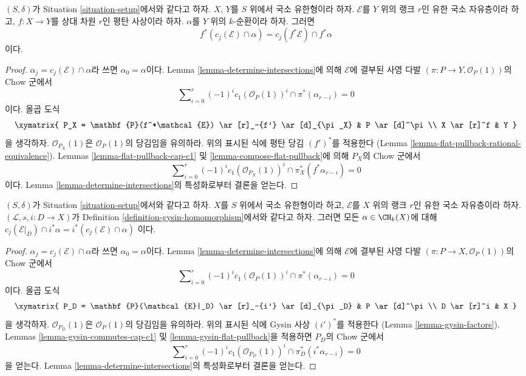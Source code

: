 \begin{lemma}
\label{lemma-flat-pullback-cap-cj}
$(S, \delta)$가 Situation \ref{situation-setup}에서와 같다고 하자.
$X$, $Y$를 $S$ 위에서 국소 유한형이라 하자. $\mathcal{E}$를 $Y$ 위의
랭크 $r$인 유한 국소 자유층이라 하고,
$f : X \to Y$를 상대 차원 $r$인 평탄 사상이라 하자. $\alpha$를 $Y$
위의 $k$-순환이라 하자. 그러면
$$
f^*(c_j(\mathcal{E}) \cap \alpha) = c_j(f^*\mathcal{E}) \cap f^*\alpha
$$
이다.
\end{lemma}

\begin{proof}
$\alpha_j = c_j(\mathcal{E}) \cap \alpha$라 쓰면
$\alpha_0 = \alpha$이다. Lemma \ref{lemma-determine-intersections}에
의해 $\mathcal{E}$에 결부된 사영 다발
$(\pi : P \to Y, \mathcal{O}_P(1))$의 Chow 군에서
$$
\sum\nolimits_{i = 0}^r
(-1)^i c_1(\mathcal{O}_P(1))^i \cap
\pi^*(\alpha_{r - i}) = 0
$$
이다. 올곱 도식
$$
\xymatrix{
P_X = \mathbf{P}(f^*\mathcal{E}) \ar[r]_-{f'} \ar[d]_{\pi_X} &
P \ar[d]^\pi \\
X \ar[r]^f & Y
}
$$
을 생각하자. $\mathcal{O}_{P_X}(1)$은 $\mathcal{O}_P(1)$의 당김임을
유의하라. 위의 표시된 식에 평탄 당김 $(f')^*$를 적용한다
(Lemma \ref{lemma-flat-pullback-rational-equivalence}). Lemmas
\ref{lemma-flat-pullback-cap-c1} 및
\ref{lemma-compose-flat-pullback}에 의해 $P_X$의 Chow 군에서
$$
\sum\nolimits_{i = 0}^r
(-1)^i c_1(\mathcal{O}_{P_X}(1))^i \cap
\pi_X^*(f^*\alpha_{r - i}) = 0
$$
이다. Lemma \ref{lemma-determine-intersections}의 특성화로부터 결론을
얻는다.
\end{proof}

\begin{lemma}
\label{lemma-cap-chern-class-commutes-with-gysin}
$(S, \delta)$가 Situation \ref{situation-setup}에서와 같다고 하자.
$X$를 $S$ 위에서 국소 유한형이라 하고, $\mathcal{E}$를 $X$ 위의
랭크 $r$인 유한 국소 자유층이라 하자.
$(\mathcal{L}, s, i : D \to X)$가 Definition
\ref{definition-gysin-homomorphism}에서와 같다고 하자. 그러면 모든
$\alpha \in \CH_k(X)$에 대해
$c_j(\mathcal{E}|_D) \cap i^*\alpha = i^*(c_j(\mathcal{E}) \cap \alpha)$
이다.
\end{lemma}

\begin{proof}
$\alpha_j = c_j(\mathcal{E}) \cap \alpha$라 쓰면
$\alpha_0 = \alpha$이다. Lemma \ref{lemma-determine-intersections}에
의해 $\mathcal{E}$에 결부된 사영 다발
$(\pi : P \to X, \mathcal{O}_P(1))$의 Chow 군에서
$$
\sum\nolimits_{i = 0}^r
(-1)^i c_1(\mathcal{O}_P(1))^i \cap
\pi^*(\alpha_{r - i}) = 0
$$
이다. 올곱 도식
$$
\xymatrix{
P_D = \mathbf{P}(\mathcal{E}|_D) \ar[r]_-{i'} \ar[d]_{\pi_D} &
P \ar[d]^\pi \\
D \ar[r]^i & X
}
$$
을 생각하자. $\mathcal{O}_{P_D}(1)$은 $\mathcal{O}_P(1)$의 당김임을
유의하라. 위의 표시된 식에 Gysin 사상 $(i')^*$를 적용한다
(Lemma \ref{lemma-gysin-factors}). Lemmas
\ref{lemma-gysin-commutes-cap-c1} 및
\ref{lemma-gysin-flat-pullback}을 적용하면 $P_D$의 Chow 군에서
$$
\sum\nolimits_{i = 0}^r
(-1)^i c_1(\mathcal{O}_{P_D}(1))^i \cap
\pi_D^*(i^*\alpha_{r - i}) = 0
$$
을 얻는다. Lemma \ref{lemma-determine-intersections}의 특성화로부터
결론을 얻는다.
\end{proof}

